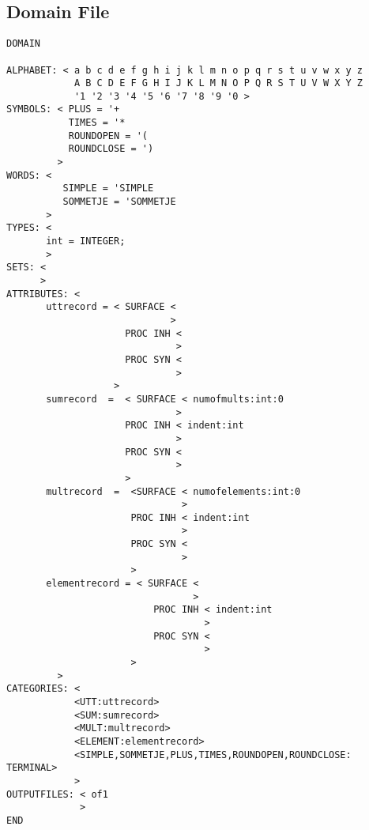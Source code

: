 \subsection{Domain File}
\begin{verbatim}
DOMAIN

ALPHABET: < a b c d e f g h i j k l m n o p q r s t u v w x y z
            A B C D E F G H I J K L M N O P Q R S T U V W X Y Z
            '1 '2 '3 '4 '5 '6 '7 '8 '9 '0 >
SYMBOLS: < PLUS = '+
           TIMES = '*
           ROUNDOPEN = '(
           ROUNDCLOSE = ')
         >
WORDS: <
          SIMPLE = 'SIMPLE
          SOMMETJE = 'SOMMETJE
       >
TYPES: <
       int = INTEGER;
       >
SETS: <
      >
ATTRIBUTES: <
       uttrecord = < SURFACE <
                             >
                     PROC INH <
                              >
                     PROC SYN <
                              >
                   >
       sumrecord  =  < SURFACE < numofmults:int:0
                              >
                     PROC INH < indent:int
                              >
                     PROC SYN <
                              >
                     >
       multrecord  =  <SURFACE < numofelements:int:0
                               >
                      PROC INH < indent:int
                               >
                      PROC SYN <
                               >
                      >
       elementrecord = < SURFACE <
                                 >
                          PROC INH < indent:int
                                   >
                          PROC SYN <
                                   >
                      >
         >
CATEGORIES: <
            <UTT:uttrecord>
            <SUM:sumrecord>
            <MULT:multrecord>
            <ELEMENT:elementrecord>
            <SIMPLE,SOMMETJE,PLUS,TIMES,ROUNDOPEN,ROUNDCLOSE: TERMINAL>
            >
OUTPUTFILES: < of1
             >
END
\end{verbatim}
\newpage
